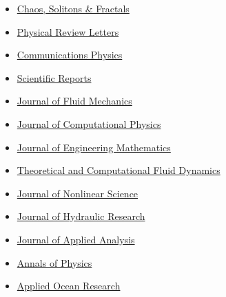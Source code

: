   \begin{itemize}

    \item[$\blacktriangleright$] \href{https://www.sciencedirect.com/journal/chaos-solitons-and-fractals/}%
    {Chaos, Solitons \& Fractals}
  
    \item[$\blacktriangleright$] \href{https://journals.aps.org/prl/}%
    {Physical Review Letters}
    
    \item[$\blacktriangleright$] \href{https://www.nature.com/commsphys/}%
    {Communications Physics}
  
    \item[$\blacktriangleright$] \href{http://www.nature.com/srep/}%
    {Scientific Reports}
  
    \item[$\blacktriangleright$] \href{http://www.jfm.damtp.cam.ac.uk/}%
    {Journal of Fluid Mechanics}
  
    \item[$\blacktriangleright$] \href{http://www.elsevier.com/locate/jcp}%
    {Journal of Computational Physics}
    
    \item[$\blacktriangleright$] \href{http://www.springer.com/physics/classical+continuum+physics/journal/10665}%
    {Journal of Engineering Mathematics}
    
    \item[$\blacktriangleright$] \href{http://www.springer.com/materials/mechanics/journal/162}%
    {Theoretical and Computational Fluid Dynamics}
    
    \item[$\blacktriangleright$] \href{http://www.springer.com/mathematics/analysis/journal/332}%
    {Journal of Nonlinear Science}
    
    \item[$\blacktriangleright$] \href{http://www.tandfonline.com/toc/tjhr20/current}%
    {Journal of Hydraulic Research}
    
    \item[$\blacktriangleright$] \href{https://www.degruyter.com/view/journals/jaa/jaa-overview.xml}{Journal of Applied Analysis}
    
    \item[$\blacktriangleright$] \href{https://www.sciencedirect.com/journal/annals-of-physics/}%
    {Annals of Physics}
    
    \item[$\blacktriangleright$] \href{http://www.journals.elsevier.com/applied-ocean-research/}%
    {Applied Ocean Research}


\end{itemize}
